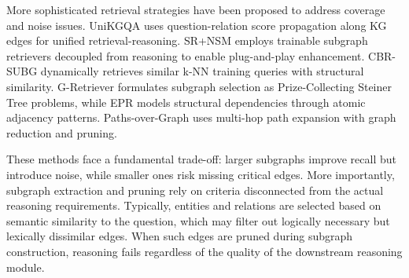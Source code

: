 \documentclass[sigconf]{acmart}
\begin{document}
More sophisticated retrieval strategies have been proposed to address coverage and noise issues. UniKGQA \citep{jiang2022unikgqa} uses question-relation score propagation along KG edges for unified retrieval-reasoning. SR+NSM \citep{zhang2022subgraph} employs trainable subgraph retrievers decoupled from reasoning to enable plug-and-play enhancement. CBR-SUBG \citep{das2022knowledge} dynamically retrieves similar k-NN training queries with structural similarity. G-Retriever \citep{he2024g} formulates subgraph selection as Prize-Collecting Steiner Tree problems, while EPR \citep{ding2024enhancing} models structural dependencies through atomic adjacency patterns. Paths-over-Graph \citep{tan2025paths} uses multi-hop path expansion with graph reduction and pruning.

These methods face a fundamental trade-off: larger subgraphs improve recall but introduce noise, while smaller ones risk missing critical edges. More importantly, subgraph extraction and pruning rely on criteria disconnected from the actual reasoning requirements. Typically, entities and relations are selected based on semantic similarity to the question, which may filter out logically necessary but lexically dissimilar edges. When such edges are pruned during subgraph construction, reasoning fails regardless of the quality of the downstream reasoning module.
\end{document}
